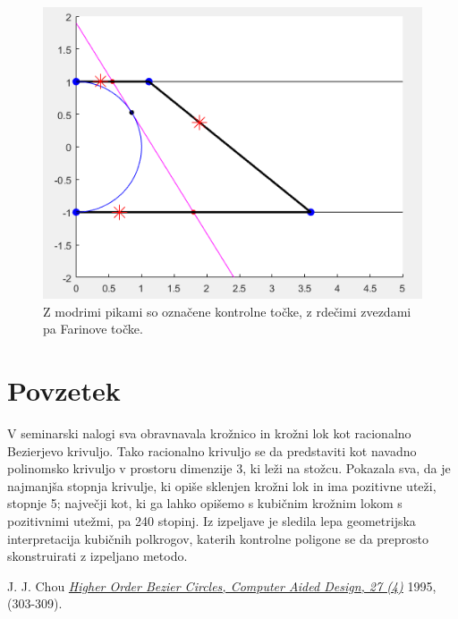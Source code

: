 \documentclass[a4paper,12pt]{article}
\begin{document}
\begin{figure}[h]
\centering
\includegraphics[scale=0.60]{konstrukcija.png}
\caption{Z modrimi pikami so označene kontrolne točke, z rdečimi zvezdami pa Farinove točke.}
\end{figure}

\section{Povzetek}
V seminarski nalogi sva obravnavala krožnico in krožni lok kot racionalno Bezierjevo krivuljo. Tako racionalno krivuljo se da  predstaviti kot navadno polinomsko krivuljo v prostoru dimenzije 3, ki leži na stožcu. Pokazala sva, da je najmanjša stopnja krivulje, ki opiše sklenjen krožni lok in ima pozitivne uteži, stopnje 5; največji kot, ki ga lahko opišemo s kubičnim krožnim lokom s pozitivnimi utežmi, pa 240 stopinj. Iz izpeljave je sledila lepa geometrijska interpretacija kubičnih polkrogov, katerih kontrolne poligone se da preprosto skonstruirati z izpeljano metodo.


\newpage
\begin{thebibliography}{1}

   J. J. Chou \href{https://www.sciencedirect.com/science/article/pii/001044859591140G}{\em Higher Order Bezier Circles, Computer Aided Design, 27 (4)}  		1995, (303-309).

\end{thebibliography}
\end{document}
